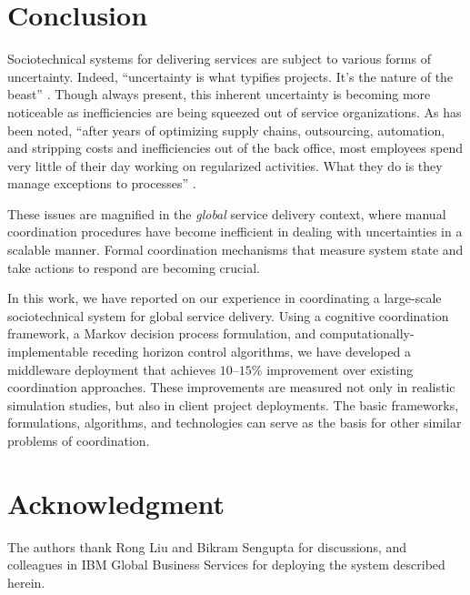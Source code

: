 \documentclass[10pt,journal,cspaper,compsoc]{IEEEtran}
\begin{document}
\section{Conclusion}

Sociotechnical systems for delivering services are subject to various forms of uncertainty. 
Indeed, ``uncertainty is 
what typifies projects. It's the nature of the beast'' \cite{Goldratt1997}.  Though always present,
this inherent uncertainty is becoming more noticeable as inefficiencies are being squeezed out 
of service organizations. As has been noted, ``after years of optimizing supply chains, 
outsourcing, automation, and stripping costs and inefficiencies out of the back office, 
most employees spend very little of their day working on regularized activities. What they 
do is they manage exceptions to processes'' \cite{TapscottW2006}.

These issues are magnified in the \emph{global} service delivery context, where manual coordination
procedures have become inefficient in dealing with uncertainties in a scalable manner.
Formal coordination mechanisms that measure system state and take actions to respond are 
becoming crucial.

In this work, we have reported on our experience in coordinating a large-scale sociotechnical system
for global service delivery.  Using a cognitive coordination framework, a Markov decision process 
formulation, and computationally-implementable receding horizon control algorithms, we 
have developed a middleware deployment that achieves $10$--$15$\% improvement over existing
coordination approaches.  These improvements are measured not only in realistic simulation
studies, but also in client project deployments.  The basic frameworks, formulations, algorithms,
and technologies can serve as the basis for other similar problems of coordination.


\section*{Acknowledgment}
The authors thank Rong Liu and Bikram Sengupta for discussions, and colleagues in IBM Global Business Services for 
deploying the system described herein.

 

\end{document}
